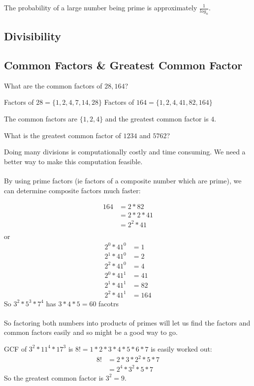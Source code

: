 The probability of a large number being prime is approximately $\frac{1}{log_n}$.

\subsection{Divisibility}

\subsection{Common Factors \& Greatest Common Factor}
What are the common factors of $28, 164$?

Factors of $28 = \{ 1,2,4,7,14,28 \}$
Factors of $164 = \{1, 2, 4, 41, 82, 164 \}$

The common factors are $\{1,2,4\}$ and the greatest common factor is $4$.

What is the greatest common factor of $1234$ and $5762$?

Doing many divisions is computationally costly and time consuming. We need a
better way to make this computation feasible.\\
\\
By using prime factors (ie factors of a composite number which are prime), we
can determine composite factors much faster:

\begin{align}
  164 & = 2 * 82 \\
      & = 2*2*41 \\
      & = 2^2 * 41 \\
\end{align} 
or
\begin{align}
  2^0 * 41^0 & = 1 \\
  2^1 * 41^0 & = 2 \\
  2^2 * 41^0 & = 4 \\
  2^0 * 41^1 & = 41 \\
  2^1 * 41^1 & = 82 \\
  2^2 * 41^1 & = 164
\end{align}
So $3^2 * 5^3 * 7^4$ has $3*4*5 = 60$ facotrs\\
\\
So factoring both numbers into products of primes will let us find the factors
and common factors easily and so might be a good way to go. 

GCF of $3^2 * 11^4 * 17^3$ is $8! = 1*2*3*4*5*6*7$
is easily worked out:
\begin{align}
  8! & = 2* 3 * 2^2 * 5 * 7 \\
     & = 2^4 * 3^2 * 5 * 7
\end{align}
So the greatest common factor is $3^2 = 9$.

